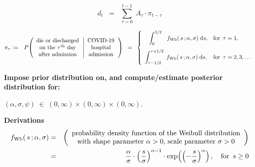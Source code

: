 \begin{equation*}
d_{t}
\;\; = \;\;
	\overset{t-1}{\underset{\tau=0}{\sum}} \; A_{\tau}\cdot\pi_{t-\tau}
\end{equation*}


\begin{eqnarray*}
\pi_{\tau}
& := &
	P\!\left(
		\begin{array}{c}
			\textnormal{die or discharged}
			\\
			\textnormal{on the $\tau^{\textnormal{th}}$ day}
			\\
			\textnormal{after admission}
			\end{array}
		\left\vert
		\begin{array}{c}
			\textnormal{COVID-19}
			\\
			\textnormal{hospital}
			\\
			\textnormal{admission}
			\end{array}
			\right.
		\right)
\;\; = \;\;
	\left\{\begin{array}{ll}
		{\color{white}..}\displaystyle\int_{0}^{3/2}\,{\color{white}..}f_{\textnormal{Wb}}(\,s\,;\alpha,\sigma) \;\d s,
		& \textnormal{for \,$\tau = 1$},
		\\
		\overset{{\color{white}1}}{\displaystyle\int_{\tau-1/2}^{\tau+1/2}\; f_{\textnormal{Wb}}(\,s\,;\alpha,\sigma) \;\d s},
		& \textnormal{for \,$\tau = 2,3,\ldots$}
		\end{array}\right.
\end{eqnarray*}

\vskip 0.5cm
\noindent
{\color{red}
\textbf{Impose prior distribution on, and compute/estimate posterior distribution for:}
\begin{center}
$(\alpha, \sigma, \psi) \;\in\; (0,\infty) \times (0,\infty) \times (0,\infty)$.
\end{center}
}


\vskip 0.5cm
\noindent
\textbf{Derivations}
\begin{eqnarray*}
f_{\textnormal{Wb}}(\,s\,;\alpha,\sigma)
& = &
	\left(\begin{array}{c}
		\textnormal{probability density function of the Weibull distribution}
		\\
		\textnormal{with shape parameter $\alpha > 0$, scale parameter $\sigma > 0$}
	\end{array}\right)
\\
& = &
	\dfrac{\alpha}{\sigma}\cdot\left(\dfrac{s}{\sigma}\right)^{\alpha-1}\cdot\exp\!\left(\left(-\dfrac{s}{\sigma}\right)^{\alpha}\right),
	\quad
	\textnormal{for \,$s \geq 0$}
\end{eqnarray*}

